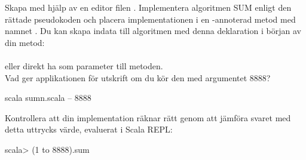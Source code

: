 \Subtask Skapa med hjälp av en editor filen . Implementera algoritmen SUM enligt den rättade pseudokoden och placera implementationen i en -annoterad metod med namnet . Du kan skapa indata  till algoritmen med denna deklaration i början av din metod: \\  \\eller direkt ha  som parameter till metoden. \\ Vad ger applikationen för utskrift om du kör den med argumentet 8888?

\begin{REPLnonum}
scala sumn.scala -- 8888
\end{REPLnonum}

\noindent Kontrollera att din implementation räknar rätt genom att jämföra svaret med detta uttrycks värde, evaluerat i Scala REPL:
\begin{REPLnonum}
scala> (1 to 8888).sum
\end{REPLnonum}






